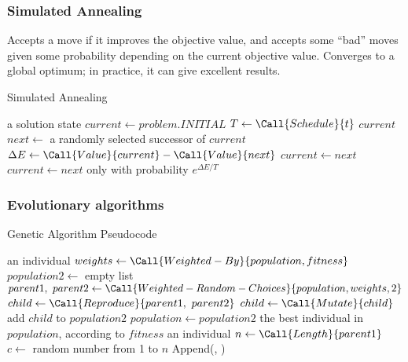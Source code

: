\documentclass[exam={Midterm},color=true]{cs581exam}
\begin{document}
\subsubsection{Simulated Annealing}\label{subsubsec:4.1.2}
Accepts a move if it improves the objective value, and accepts some ``bad'' moves given some probability depending on the current objective value.
Converges to a global optimum; in practice, it can give excellent results.
\begin{algorithm}[H]
	\caption{Simulated Annealing}\label{alg:simulated-annealing}
	\begin{algorithmic}[1]
	 \Returns a solution state
		\State $current\gets problem.INITIAL$
			\State $T\gets\Call{Schedule}{t}$
				\Return $current$
			\EndIf
			\State $next\gets$ a randomly selected successor of $current$
			\State $\Delta E\gets\Call{Value}{current} - \Call{Value}{next}$
				$current\gets next$
			\Else\
				$current\gets next$ only with probability $e^{\Delta E/T}$
			\EndIf
		\EndFor
	\EndFunction
	\end{algorithmic}
\end{algorithm}

\setcounter{subsection}{3}%
\subsubsection{Evolutionary algorithms}\label{subsubsec:4.1.4}
\begin{algorithm}[H]
	\caption{Genetic Algorithm Pseudocode}\label{alg:genetric-algorithm}
	\begin{algorithmic}[1]
		 \Returns an individual
		\Repeat
			\State $weights\gets\Call{Weighted-By}{population, fitness}$
			\State $population2\gets$ empty list
				\State $parent1,\ parent2\gets\Call{Weighted-Random-Choices}{population, weights, 2}$
				\State $child\gets\Call{Reproduce}{parent1,\ parent2}$
					$child\gets\Call{Mutate}{child}$
				\EndIf
				\State add $child$ to $population2$
			\EndFor
			\State $population\gets population2$
		\State \Return the best individual in $population$, according to $fitness$
		\EndFunction
		 \Returns an individual
			\State $n\gets\Call{Length}{parent1}$
			\State $c\gets$ random number from 1 to $n$
			\State \Return Append(, )
		\EndFunction
	\end{algorithmic}
\end{algorithm}
\end{document}
